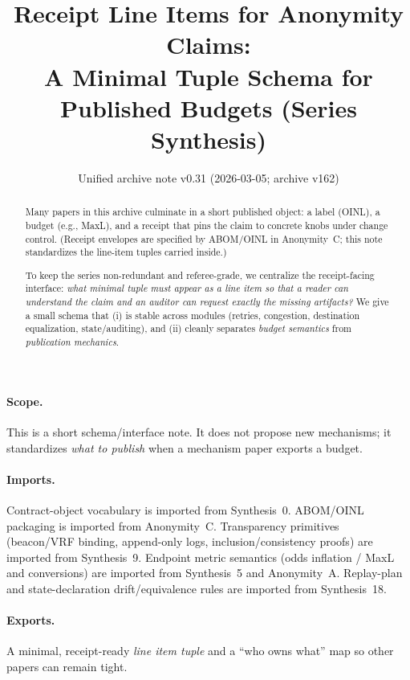 \documentclass[11pt]{article}
\title{Receipt Line Items for Anonymity Claims:\\
\large A Minimal Tuple Schema for Published Budgets (Series Synthesis)}
\author{}
\date{Unified archive note v0.31 (2026-03-05; archive v162)}
\begin{document}
\maketitle

\begin{abstract}
Many papers in this archive culminate in a short published object: a label (OINL), a budget (e.g., MaxL), and a receipt that pins the claim to concrete knobs under change control.
(Receipt envelopes are specified by ABOM/OINL in Anonymity~C; this note standardizes the line-item tuples carried inside.)\cite{series:abomoinl}

To keep the series non-redundant and referee-grade, we centralize the receipt-facing interface:
\emph{what minimal tuple must appear as a line item so that a reader can understand the claim and an auditor can request exactly the missing artifacts?}
We give a small schema that (i) is stable across modules (retries, congestion, destination equalization, state/auditing), and (ii) cleanly separates \emph{budget semantics} from \emph{publication mechanics}.
\end{abstract}

\paragraph{Scope.}
This is a short schema/interface note.
It does not propose new mechanisms; it standardizes \emph{what to publish} when a mechanism paper exports a budget.

\paragraph{Imports.}
Contract-object vocabulary is imported from Synthesis~0.\cite{series:contractobjects}
ABOM/OINL packaging is imported from Anonymity~C.\cite{series:abomoinl}
Transparency primitives (beacon/VRF binding, append-only logs, inclusion/consistency proofs) are imported from Synthesis~9.\cite{series:transparencyprimitives}
Endpoint metric semantics (odds inflation / MaxL and conversions) are imported from Synthesis~5 and Anonymity~A.\cite{series:endpointbridge,series:oddsinflation}
Replay-plan and state-declaration drift/equivalence rules are imported from Synthesis~18.\cite{series:planstateequiv}

\paragraph{Exports.}
A minimal, receipt-ready \emph{line item tuple} and a ``who owns what'' map so other papers can remain tight.
\end{document}
